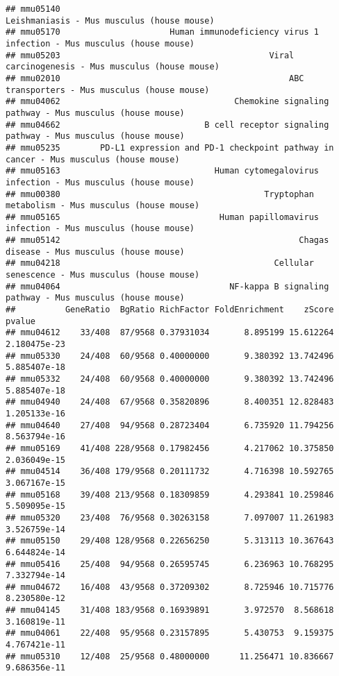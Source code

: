 \documentclass[
]{article}
\begin{document}
\begin{verbatim}
## mmu05140                                                 Leishmaniasis - Mus musculus (house mouse)
## mmu05170                      Human immunodeficiency virus 1 infection - Mus musculus (house mouse)
## mmu05203                                          Viral carcinogenesis - Mus musculus (house mouse)
## mmu02010                                              ABC transporters - Mus musculus (house mouse)
## mmu04062                                   Chemokine signaling pathway - Mus musculus (house mouse)
## mmu04662                             B cell receptor signaling pathway - Mus musculus (house mouse)
## mmu05235        PD-L1 expression and PD-1 checkpoint pathway in cancer - Mus musculus (house mouse)
## mmu05163                               Human cytomegalovirus infection - Mus musculus (house mouse)
## mmu00380                                         Tryptophan metabolism - Mus musculus (house mouse)
## mmu05165                                Human papillomavirus infection - Mus musculus (house mouse)
## mmu05142                                                Chagas disease - Mus musculus (house mouse)
## mmu04218                                           Cellular senescence - Mus musculus (house mouse)
## mmu04064                                  NF-kappa B signaling pathway - Mus musculus (house mouse)
##          GeneRatio  BgRatio RichFactor FoldEnrichment    zScore       pvalue
## mmu04612    33/408  87/9568 0.37931034       8.895199 15.612264 2.180475e-23
## mmu05330    24/408  60/9568 0.40000000       9.380392 13.742496 5.885407e-18
## mmu05332    24/408  60/9568 0.40000000       9.380392 13.742496 5.885407e-18
## mmu04940    24/408  67/9568 0.35820896       8.400351 12.828483 1.205133e-16
## mmu04640    27/408  94/9568 0.28723404       6.735920 11.794256 8.563794e-16
## mmu05169    41/408 228/9568 0.17982456       4.217062 10.375850 2.036049e-15
## mmu04514    36/408 179/9568 0.20111732       4.716398 10.592765 3.067167e-15
## mmu05168    39/408 213/9568 0.18309859       4.293841 10.259846 5.509095e-15
## mmu05320    23/408  76/9568 0.30263158       7.097007 11.261983 3.526759e-14
## mmu05150    29/408 128/9568 0.22656250       5.313113 10.367643 6.644824e-14
## mmu05416    25/408  94/9568 0.26595745       6.236963 10.768295 7.332794e-14
## mmu04672    16/408  43/9568 0.37209302       8.725946 10.715776 8.230580e-12
## mmu04145    31/408 183/9568 0.16939891       3.972570  8.568618 3.160819e-11
## mmu04061    22/408  95/9568 0.23157895       5.430753  9.159375 4.767421e-11
## mmu05310    12/408  25/9568 0.48000000      11.256471 10.836667 9.686356e-11

\end{verbatim}
\end{document}

